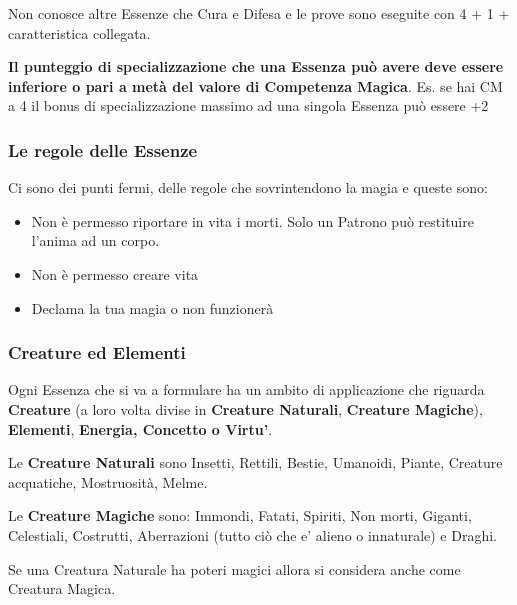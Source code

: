 \documentclass[a4paper,10 pt,twoside,openany]{book}
\begin{document}
Non conosce altre Essenze che Cura e Difesa e le prove sono eseguite con 4 + 1 + caratteristica collegata.

\bigskip

\textbf{Il punteggio di specializzazione che una Essenza può avere deve essere inferiore o pari a metà del valore di Competenza Magica}. Es. se hai CM a 4 il bonus di specializzazione massimo ad una singola Essenza può essere +2

\subsubsection{Le regole delle Essenze}

\label{le-regole-delle-essenze}

Ci sono dei punti fermi, delle regole che sovrintendono la magia e queste sono:
\begin{itemize}
	\item Non è permesso riportare in vita i morti. Solo un Patrono può restituire l'anima ad un corpo.

	\item Non è permesso creare vita

	\item Declama la tua magia o non funzionerà

\end{itemize}

\subsubsection{Creature ed Elementi}

\label{creature-ed-elementi}

Ogni Essenza che si va a formulare ha un ambito di applicazione che riguarda \textbf{Creature} (a loro volta divise in \textbf{Creature Naturali}, \textbf{Creature Magiche}), \textbf{Elementi}, \textbf{Energia, Concetto o Virtu'}.
\bigskip

Le \textbf{Creature Naturali} sono Insetti, Rettili, Bestie, Umanoidi, Piante, Creature acquatiche, Mostruosità, Melme.

Le \textbf{Creature Magiche} sono: Immondi, Fatati, Spiriti, Non morti, Giganti, Celestiali, Costrutti, Aberrazioni (tutto ciò che e' alieno o innaturale) e Draghi.

Se una Creatura Naturale ha poteri magici allora si considera anche come Creatura Magica.
\end{document}
